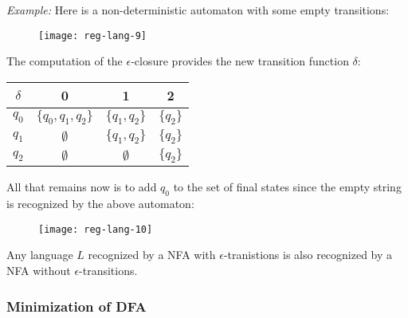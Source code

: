 \textit{Example:} Here is a non-deterministic automaton with 
some empty transitions:
\begin{figure}[H]
  \centering
  \texttt{[image: reg-lang-9]}
\end{figure}
The computation of the $\epsilon$-closure
provides the new transition function $\delta$:

\begin{table}[H]
  \centering
  \begin{tabular}{c | c | c | c} 
  $\delta$ & 0 & 1 & 2\\
  \hline
    $q_0$ & $\{q_0, q_1, q_2\}$ & $\{q_1, q_2\}$ & $\{q_2\}$\\
    $q_1$ & $\emptyset$ & $\{q_1, q_2\}$ & $\{q_2\}$\\
    $q_2$ & $\emptyset$ & $\emptyset$ & $\{q_2\}$
  \end{tabular}
\end{table}
All that remains now is to add $q_0$ to the 
set of final states since the empty string is
recognized by the above automaton:
\begin{figure}[H]
  \centering
  \texttt{[image: reg-lang-10]}
\end{figure}
Any language $L$ recognized by a NFA with $\epsilon$-tranistions
is also recognized by a NFA without $\epsilon$-transitions.

\subsubsection{Minimization of DFA}

